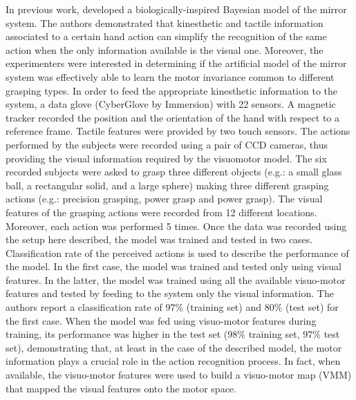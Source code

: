 In previous work,
\citet{metta.etal:2006} developed a biologically-inspired Bayesian model of
the mirror system.
The authors demonstrated that kinesthetic and tactile information associated to
a certain hand action can simplify the recognition of the same action when the
only information available is the visual one.
Moreover, the experimenters were interested in determining if the artificial
model
of the mirror system was effectively able to learn the motor invariance common
to different grasping types.
In order to feed the appropriate kinesthetic information to the system, a data
glove (CyberGlove by Immersion) with 22 sensors.
A magnetic tracker recorded the position and the orientation of the hand with
respect to a reference frame.
Tactile features were provided by two touch sensors. The actions performed by
the subjects were recorded using a pair of CCD cameras, thus providing the
visual information required by the visuomotor model. 
The six recorded subjects were asked to grasp three different objects 
(e.g.: a small glass ball, a rectangular solid, and a large sphere) making three
different grasping actions (e.g.: precision grasping, power grasp and power
grasp).
The visual features of the grasping actions were recorded from 12 different
locations. Moreover, each action was performed 5 times.
Once the data was recorded using the setup here described, the model was
trained and tested in two cases. Classification rate of the perceived actions is
used to describe the performance of the model.
In the first case, the model was trained and tested only using visual
features.
In the latter, the model was trained using all the available visuo-motor 
features and tested by feeding to the system only the visual
information.
The authors report a classification rate of $97\%$ (training set) and $80\%$
(test set) for the first case. 
When the model was fed using visuo-motor features during training, its
performance was higher in the test set ($98\%$ training set, $97\%$ test 
set), demonstrating that, at least in the case of the described model, the
motor information plays a crucial role in the action recognition process.
In fact, when available, the visuo-motor features were used to build a
visuo-motor map (VMM) that mapped the visual features onto the motor space.

